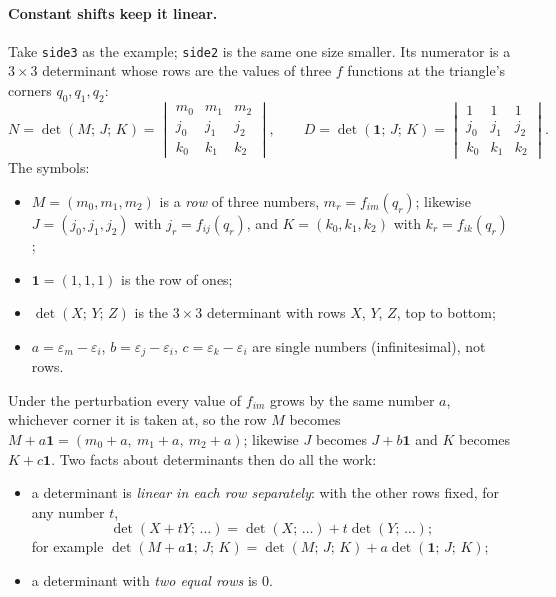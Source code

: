 \documentclass[11pt,a4paper]{article}
\newcommand{\code}[1]{\texttt{#1}}
\theoremstyle{definition}
\theoremstyle{remark}
\begin{document}
\paragraph{Constant shifts keep it linear.} Take \code{side3} as the example; \code{side2} is the
same one size smaller. Its numerator is a $3\times3$ determinant whose rows are the values of
three $f$ functions at the triangle's corners $q_0, q_1, q_2$:
\[
  N = \det(M;\,J;\,K) =
  \begin{vmatrix} m_0 & m_1 & m_2\\ j_0 & j_1 & j_2\\ k_0 & k_1 & k_2 \end{vmatrix},
  \qquad
  D = \det(\mathbf 1;\,J;\,K) =
  \begin{vmatrix} 1 & 1 & 1\\ j_0 & j_1 & j_2\\ k_0 & k_1 & k_2 \end{vmatrix}.
\]
The symbols:
\begin{itemize}
  \item $M = (m_0, m_1, m_2)$ is a \emph{row} of three numbers, $m_r = f_{im}(q_r)$; likewise
    $J = (j_0, j_1, j_2)$ with $j_r = f_{ij}(q_r)$, and $K = (k_0, k_1, k_2)$ with
    $k_r = f_{ik}(q_r)$;
  \item $\mathbf 1 = (1, 1, 1)$ is the row of ones;
  \item $\det(X;\,Y;\,Z)$ is the $3\times3$ determinant with rows $X$, $Y$, $Z$, top to bottom;
  \item $a = \varepsilon_m - \varepsilon_i$, $b = \varepsilon_j - \varepsilon_i$,
    $c = \varepsilon_k - \varepsilon_i$ are single numbers (infinitesimal), not rows.
\end{itemize}
Under the perturbation every value of $f_{im}$ grows by the same number $a$, whichever corner it
is taken at, so the row $M$ becomes $M + a\mathbf 1 = (m_0 + a,\ m_1 + a,\ m_2 + a)$; likewise
$J$ becomes $J + b\mathbf 1$ and $K$ becomes $K + c\mathbf 1$. Two facts about determinants then
do all the work:
\begin{itemize}
  \item a determinant is \emph{linear in each row separately}: with the other rows fixed, for any
    number $t$,
    \[
      \det(X + tY;\,\dots) = \det(X;\,\dots) + t\det(Y;\,\dots);
    \]
    for example $\det(M + a\mathbf 1;\,J;\,K) = \det(M;\,J;\,K) + a\det(\mathbf 1;\,J;\,K)$;
  \item a determinant with \emph{two equal rows} is 0.
\end{itemize}
\end{document}
